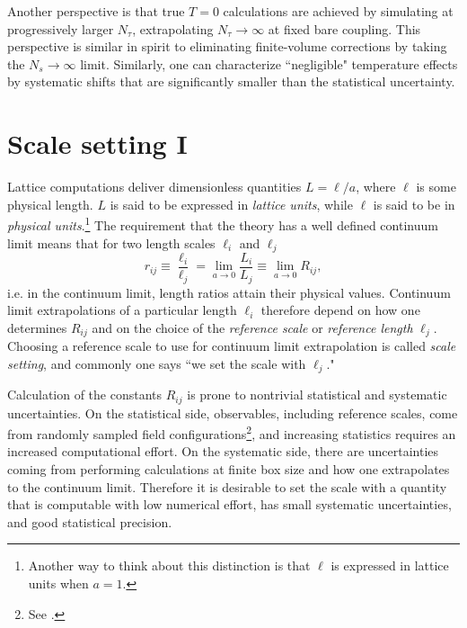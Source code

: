 Another perspective is that true $T=0$ calculations are achieved by simulating
at progressively larger $N_\tau$, extrapolating $N_\tau\to\infty$ at fixed
bare coupling. This perspective is similar in spirit to eliminating
finite-volume corrections by taking the $N_s\to\infty$ limit. Similarly, one can
characterize ``negligible" temperature effects by systematic shifts that are
significantly smaller than the statistical uncertainty.

\section{Scale setting I}\label{sec:refscales}


Lattice computations deliver dimensionless quantities $L=\ell/a$, where 
$\ell$ is some physical length. $L$ is said to be expressed in {\it lattice
units}, while $\ell$ is said to be in {\it physical
units}.\footnote{Another way to think about this
distinction is that $\ell$ is expressed in lattice units when $a=1$.}
The requirement that the theory has a 
well defined continuum limit means that for two length scales 
$\ell_i$ and $\ell_j$
\begin{equation}
  r_{ij}\equiv\frac{\ell_i}{\ell_j}=\lim_{a\to 0}\frac{L_i}{L_j}
        \equiv\lim_{a\to 0}R_{ij},
\end{equation}
i.e. in the continuum limit, length ratios attain their physical values.
Continuum limit extrapolations of a particular length $\ell_i$ therefore
depend on how one determines $R_{ij}$ and on the choice of the
{\it reference scale} or {\it reference length} $\ell_j$. 
Choosing a reference scale to use for continuum limit extrapolation
is called {\it scale setting}, and commonly one says
``we set the scale with $\ell_j$." 


Calculation of the constants $R_{ij}$ is prone to nontrivial statistical and
systematic uncertainties. On the statistical side, observables, including
reference scales, come from randomly sampled field 
configurations\footnote{See .}, and increasing statistics
requires an increased computational effort. On the systematic side, there are
uncertainties coming from performing calculations at finite box size and how one
extrapolates to the continuum limit. Therefore it is desirable to set
the scale with a quantity that is computable with low numerical effort,
has small systematic uncertainties, and good statistical precision.


